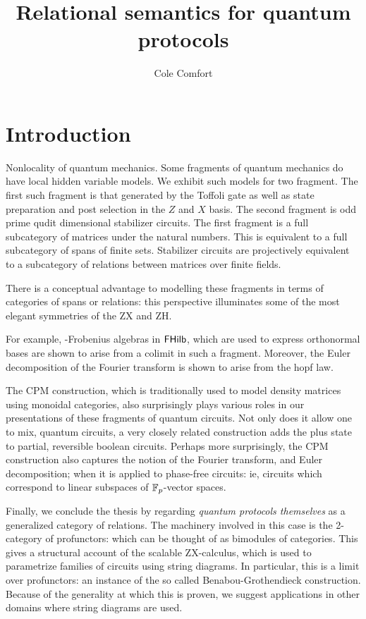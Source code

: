 \documentclass[12pt]{ociamthesis}  %
\title{Relational semantics for quantum protocols}
\author{Cole Comfort}
\begin{document}
\maketitle

\tableofcontents


\chapter{Introduction}


Nonlocality of quantum mechanics. Some fragments of quantum mechanics do have local hidden variable models.  We exhibit such models for two fragment. The first such fragment is that generated by the Toffoli gate as well as state preparation and post selection in the $Z$ and $X$ basis.  The second fragment is odd prime qudit dimensional stabilizer circuits.  The first fragment is a full subcategory of matrices under the natural numbers.  This is equivalent to a full subcategory of spans of finite sets.
Stabilizer circuits are projectively equivalent to a subcategory of relations between matrices over finite fields.

There is a conceptual advantage to modelling these fragments in terms of categories of spans or relations:  this perspective illuminates some of the most elegant symmetries of the ZX and ZH.

For example, \dag-Frobenius algebras in $\mathsf{FHilb}$, which are used to express orthonormal bases are shown to arise from a colimit in such a fragment.  Moreover, the Euler decomposition of the Fourier transform is shown to arise from the hopf law.

The CPM construction, which is traditionally used to model density matrices using monoidal categories, also surprisingly plays various roles in our presentations of these fragments of quantum circuits.  Not only does it allow one to mix, quantum circuits, a very closely related construction adds the plus state to partial, reversible boolean circuits.  Perhaps more surprisingly, the CPM construction also captures the notion of the Fourier transform, and Euler decomposition; when it is applied to phase-free circuits: ie, circuits which correspond to linear subspaces of $\mathbb{F}_p$-vector spaces.

Finally, we conclude the thesis by regarding {\em quantum protocols themselves} as a generalized category of relations.  The machinery involved in this case is the 2-category of profunctors: which can be thought of as bimodules of categories.  This gives a structural account of the scalable ZX-calculus, which is used to parametrize families of circuits using string diagrams.  In particular, this is a limit over profunctors: an instance of the so called Benabou-Grothendieck construction.  Because of the generality at which this is proven, we suggest applications in other domains where string diagrams are used. 
\end{document}
